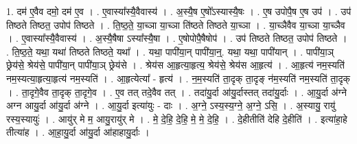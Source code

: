 \documentclass[17pt]{extarticle}
\begin{document}
1. दम॑ ए॒वैव दमो॒ दम॑ ए॒व । . ए॒वास्या᳚स्यै॒वैवास्य॑ । . अ॒स्यै॒ष ए॒षो᳚ऽस्यास्यै॒षः । . ए॒ष उपोपै॒ष ए॒ष उप॑ । . उप॑ तिष्ठते तिष्ठत॒ उपोप॑ तिष्ठते । . ति॒ष्ठ॒ते॒ या॒च्ञा या॒च्ञा ति॑ष्ठते तिष्ठते या॒च्ञा । . या॒च्ञैवैव या॒च्ञा या॒च्ञैव । . ए॒वास्या᳚स्यै॒वैवास्य॑ । . अ॒स्यै॒षैषा ऽस्या᳚स्यै॒षा । . ए॒षोपोपै॒षैषोप॑ । . उप॑ तिष्ठते तिष्ठत॒ उपोप॑ तिष्ठते । . ति॒ष्ठ॒ते॒ यथा॒ यथा॑ तिष्ठते तिष्ठते॒ यथा᳚ । . यथा॒ पापी॑या॒न् पापी॑या॒न्॒. यथा॒ यथा॒ पापी॑यान् । . पापी॑या॒ञ् छ्रेय॑से॒ श्रेय॑से॒ पापी॑या॒न् पापी॑या॒ञ् छ्रेय॑से । . श्रेय॑स आ॒हृत्या॒हृत्य॒ श्रेय॑से॒ श्रेय॑स आ॒हृत्य॑ । . आ॒हृत्य॑ नम॒स्यति॑ नम॒स्यत्या॒हृत्या॒हृत्य॑ नम॒स्यति॑ । . आ॒हृत्येत्या᳚ - हृत्य॑ । . न॒म॒स्यति॑ ता॒दृक् ता॒दृङ् न॑म॒स्यति॑ नम॒स्यति॑ ता॒दृक् । . ता॒दृगे॒वैव ता॒दृक् ता॒दृगे॒व । . ए॒व तत् तदे॒वैव तत् । . तदा॑यु॒र्दा आ॑यु॒र्दास्तत् तदा॑यु॒र्दाः । . आ॒यु॒र्दा अ॑ग्ने अग्न आयु॒र्दा आ॑यु॒र्दा अ॑ग्ने । . आ॒यु॒र्दा इत्या॑युः - दाः । . अ॒ग्ने॒ ऽस्य॒स्य॒ग्ने॒ अ॒ग्ने॒ ऽसि॒ । . अ॒स्यायु॒ रायु॑ रस्य॒स्यायुः॑ । . आयु॑र् मे म॒ आयु॒रायु॑र् मे । . मे॒ दे॒हि॒ दे॒हि॒ मे॒ मे॒ दे॒हि॒ । . दे॒हीतीति॑ देहि दे॒हीति॑ । . इत्या॑हा॒हे तीत्या॑ह । . आ॒हा॒यु॒र्दा आ॑यु॒र्दा आ॑हाहायु॒र्दाः । \newline
\end{document}
